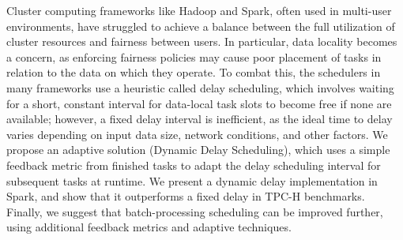 
Cluster computing frameworks like Hadoop and Spark, often used in multi-user environments, have struggled to achieve a balance between the full utilization of cluster resources and fairness between users. In particular, data locality becomes a concern, as enforcing fairness policies may cause poor placement of tasks in relation to the data on which they operate. To combat this, the schedulers in many frameworks use a heuristic called delay scheduling, which involves waiting for a short, constant interval for data-local task slots to become free if none are available; however, a fixed delay interval is inefficient, as the ideal time to delay varies depending on input data size, network conditions, and other factors. We propose an adaptive solution (Dynamic Delay Scheduling), which uses a simple feedback metric from finished tasks to adapt the delay scheduling interval for subsequent tasks at runtime. We present a dynamic delay implementation in Spark, and show that it outperforms a fixed delay in TPC-H benchmarks. Finally, we suggest that batch-processing scheduling can be improved further, using additional feedback metrics and adaptive techniques.
